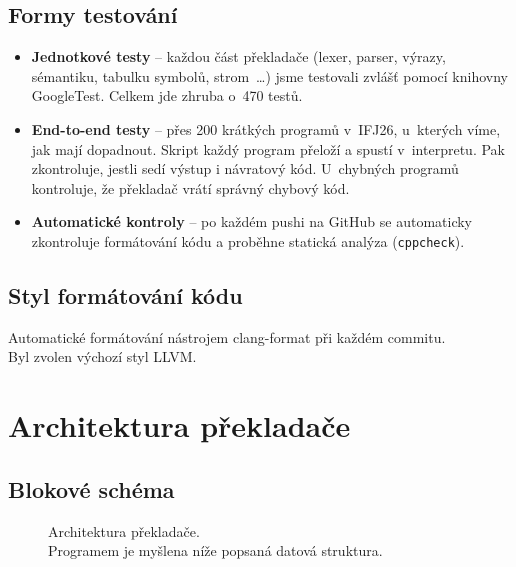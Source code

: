 \documentclass[a4paper,11pt]{article}
\begin{document}
\subsection{Formy testování}
\begin{itemize}
  \item \textbf{Jednotkové testy} -- každou část překladače (lexer, parser,
        výrazy, sémantiku, tabulku symbolů, strom~\dots) jsme testovali zvlášť
        pomocí knihovny GoogleTest. Celkem jde zhruba o~470 testů.
  \item \textbf{End-to-end testy} -- přes 200 krátkých programů v~IFJ26,
        u~kterých víme, jak mají dopadnout. Skript každý program přeloží
        a spustí v~interpretu. Pak zkontroluje, jestli sedí výstup i návratový
        kód. U~chybných programů kontroluje, že překladač vrátí správný
        chybový kód.
  \item \textbf{Automatické kontroly} -- po každém pushi na GitHub se
        automaticky zkontroluje formátování kódu a proběhne statická analýza
        (\texttt{cppcheck}).
\end{itemize}

\subsection{Styl formátování kódu}
Automatické formátování nástrojem clang-format při každém commitu.\\
Byl zvolen výchozí styl LLVM.

\section{Architektura překladače}
\label{sec:architektura}
\subsection{Blokové schéma}
\begin{figure}[H]
  \centering
  
  
  \caption{Architektura překladače.\\
    \footnotesize * Programem je myšlena níže popsaná datová struktura.
  }
  \label{fig:architektura}
\end{figure}
\end{document}
